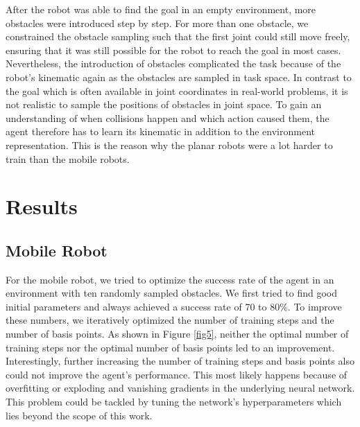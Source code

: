 \documentclass[conference]{IEEEtran}
\begin{document}
After the robot was able to find the goal in an empty environment, more obstacles were introduced step by step. For more than one obstacle, we constrained the obstacle sampling such that the first joint could still move freely, ensuring that it was still possible for the robot to reach the goal in most cases. Nevertheless, the introduction of obstacles complicated the task because of the robot's kinematic again as the obstacles are sampled in task space. In contrast to the goal which is often available in joint coordinates in real-world problems, it is not realistic to sample the positions of obstacles in joint space. To gain an understanding of when collisions happen and which action caused them, the agent therefore has to learn its kinematic in addition to the environment representation. This is the reason why the planar robots were a lot harder to train than the mobile robots.

\section{Results}

\subsection{Mobile Robot}

For the mobile robot, we tried to optimize the success rate of the agent in an environment with ten randomly sampled obstacles. We first tried to find good initial parameters and always achieved a success rate of 70 to 80\%. To improve these numbers, we iteratively optimized the number of training steps and the number of basis points. As shown in Figure \ref{fig5}, neither the optimal number of training steps nor the optimal number of basis points led to an improvement. Interestingly, further increasing the number of training steps and basis points also could not improve the agent's performance. This most likely happens because of overfitting or exploding and vanishing gradients in the underlying neural network. This problem could be tackled by tuning the network's hyperparameters which lies beyond the scope of this work.
\end{document}
